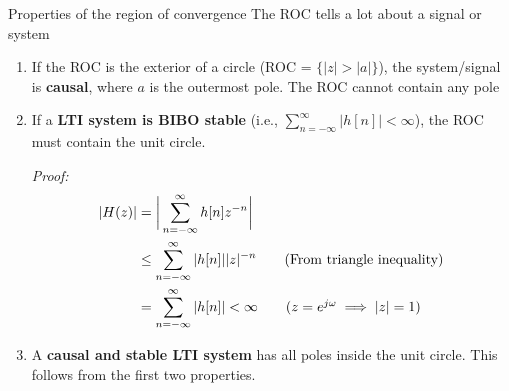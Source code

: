\documentclass[10pt, handout]{beamer}
\begin{document}
%
\begin{frame}{Properties of the region of convergence}
	The ROC tells a lot about a signal or system
	\begin{enumerate}
		\item If the ROC is the exterior of a circle (ROC = $\{|z| > |a|\}$), the system/signal is \textbf{causal}, where $a$ is the outermost pole. The ROC cannot contain any pole
		\pause\item If a \textbf{LTI system is BIBO stable} (i.e., $\sum_{n=-\infty}^{\infty} |h[n]|<\infty$), the ROC must contain the unit circle.
		
		\textit{Proof:}
		\vspace{-0.25cm}
		\begin{align*}
		|H(z)| &= \bigg|\sum_{n=-\infty}^{\infty}h[n]z^{-n}\bigg| \\
		&\leq \sum_{n=-\infty}^{\infty} |h[n]||z|^{-n} \tag{From triangle inequality} \\
		&= \sum_{n=-\infty}^{\infty} |h[n]| <\infty \tag{$z = e^{j\omega} \implies |z|=1$}
		\end{align*}
		\pause\item A \textbf{causal and stable LTI system} has all poles inside the unit circle. This follows from the first two properties.
	\end{enumerate}
\end{frame}
\end{document}
